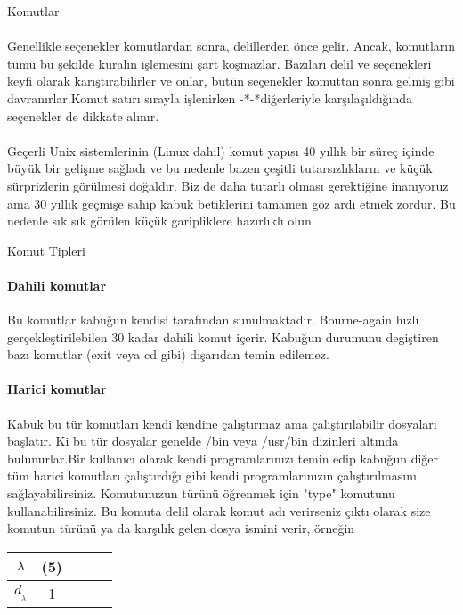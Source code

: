 \documentclass[10pt,a5paper]{book}
\begin{document}
\begin{section}{Komutlar}
\paragraph{}{Genellikle seçenekler komutlardan sonra, delillerden önce gelir. Ancak, komutların tümü bu şekilde kuralın işlemesini şart koşmazlar. Bazıları delil ve seçenekleri keyfi olarak karıştırabilirler ve onlar, bütün seçenekler komuttan sonra gelmiş gibi davranırlar.Komut satırı sırayla işlenirken -*-*diğerleriyle karşılaşıldığında seçenekler de dikkate alınır.}
\paragraph{}{Geçerli Unix sistemlerinin (Linux dahil) komut yapısı 40 yıllık bir süreç içinde büyük bir gelişme sağladı ve bu nedenle bazen çeşitli tutarsızlıkların ve küçük sürprizlerin görülmesi doğaldır. Biz de daha tutarlı olması gerektiğine inanıyoruz ama 30 yıllık geçmişe sahip kabuk betiklerini tamamen göz ardı etmek zordur. Bu nedenle sık sık görülen küçük garipliklere hazırlıklı olun.}

\begin{subsection}{Komut Tipleri}
\paragraph{Dahili komutlar}{Bu komutlar kabuğun kendisi tarafından sunulmaktadır. Bourne-again hızlı gerçekleştirilebilen 30 kadar dahili komut içerir. Kabuğun durumunu degiştiren bazı komutlar (exit veya cd gibi) dışarıdan temin edilemez.}
\paragraph{Harici komutlar}{Kabuk bu tür komutları kendi kendine çalıştırmaz ama çalıştırılabilir dosyaları başlatır. Ki bu tür dosyalar genelde /bin veya /usr/bin 
dizinleri altında bulunurlar.Bir kullanıcı olarak kendi programlarınızı temin edip kabuğun diğer tüm harici komutları çalıştırdığı gibi kendi programlarınızın çalıştırılmasını sağlayabilirsiniz. Komutunuzun türünü öğrenmek için "type" komutunu kullanabilirsiniz. Bu komuta delil olarak komut adı verirseniz çıktı olarak size komutun türünü ya da karşılık gelen dosya ismini verir, örneğin}
\begin{tabular}{cccc|c|}
  $\lambda$& (5)& \\
\hline 
  $d_{_\lambda}$& 1\\ 
\end{tabular}
\end{subsection}
\end{section}
\end{document}
